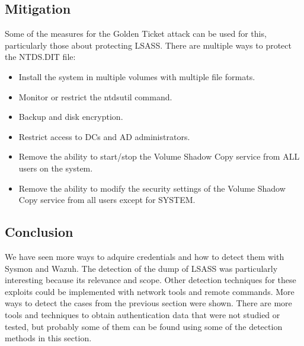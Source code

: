 \subsection{Mitigation}
Some of the measures for the Golden Ticket attack can be used for this, particularly those about protecting LSASS.
\linej
There are multiple ways to protect the NTDS.DIT file\cite{protect_NTDS}\cite{hood}:
\begin{itemize}
	\item Install the system in multiple volumes with multiple file formats.
	\item Monitor or restrict the ntdsutil command.
	\item Backup and disk encryption.
	\item Restrict access to DCs and AD administrators.
	\item Remove the ability to start/stop the Volume Shadow Copy service from ALL users on the system.
	\item Remove the ability to modify the security settings of the Volume Shadow Copy service from all users except for SYSTEM.
\end{itemize}

\subsection{Conclusion}
We have seen more ways to adquire credentials and how to detect them with Sysmon and Wazuh. The detection of the dump of LSASS was particularly interesting because its relevance and scope.
\linej
Other detection techniques for these exploits could be implemented with network tools and remote commands.
More ways to detect the cases from the previous section were shown.
There are more tools and techniques to obtain authentication data that were not studied or tested, but probably some of them can be found using some of the detection methods in this section.

